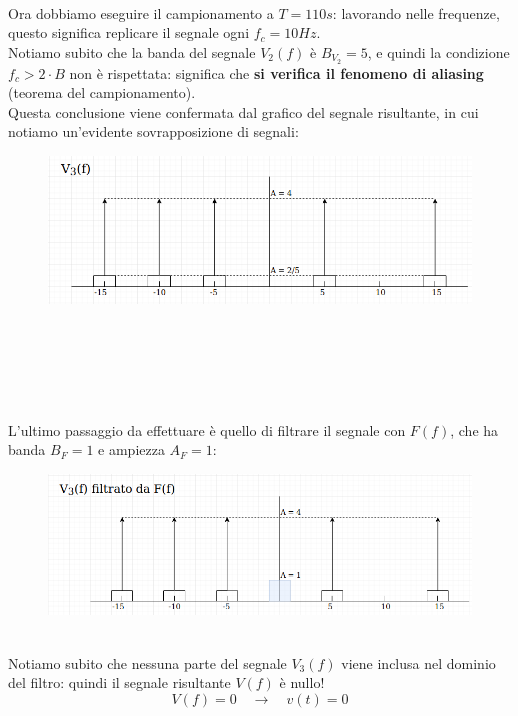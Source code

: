 \documentclass[12pt,a4paper]{article}
\begin{document}
	\\Ora dobbiamo eseguire il campionamento a $T = 110s$: lavorando nelle frequenze, questo significa replicare il segnale ogni $f_c = 10Hz$.\\Notiamo subito che la banda del segnale $V_2(f)$ è $B_{V_2} = 5$, e quindi la condizione $f_c > 2\cdot B$ non è rispettata: significa che \textbf{si verifica il fenomeno di aliasing} (teorema del campionamento).\\Questa conclusione viene confermata dal grafico del segnale risultante, in cui notiamo un'evidente sovrapposizione di segnali:
	\begin{figure}[h!]
		\centering
		\includegraphics[scale=0.4]{./images/fourier26.png}
	\end{figure}
	\\ \\ \\ \\ \\L'ultimo passaggio da effettuare è quello di filtrare il segnale con $F(f)$, che ha banda $B_F = 1$ e ampiezza $A_F = 1$:
	\begin{figure}[h!]
		\centering
		\includegraphics[scale=0.4]{./images/fourier27.png}
	\end{figure}
	\\Notiamo subito che nessuna parte del segnale $V_3(f)$ viene inclusa nel dominio del filtro: quindi il segnale risultante $V(f)$ è nullo!
	\[
		V(f) = 0\quad\rightarrow\quad v(t) = 0 
	\]
	\newpage
\end{document}
